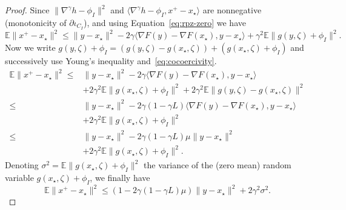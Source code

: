 \documentclass{article}
\newcommand{\1}{\mathbbm 1}
\newcommand{\bE}{{{\mathbb E}}}
\newcommand{\ps}[1]{\langle #1 \rangle}
\theoremstyle{definition}
\begin{document}
\begin{proof}
Since $\|\nabla ^\gamma h - \phi_I\|^2$ and $\ps{\nabla ^\gamma h - \phi_I,x^+-x_\star}$ are nonnegative (monotonicity of $\partial \iota_{C_I}$), and using Equation~\eqref{eq:rpz-zero} we have
\begin{equation*}
    \bE \|x^+ - x_\star\|^2 \leq \|y - x_\star\|^2 -2\gamma \ps{\nabla F(y) - \nabla F(x_\star),y-x_\star} + \gamma^2 \bE \|g(y,\zeta) + \phi_I\|^2.
\end{equation*}
Now we write $g(y,\zeta) + \phi_I = (g(y,\zeta) - g(x_\star,\zeta)) + (g(x_\star,\zeta) + \phi_I)$ and successively use Young's inequality and~\eqref{eq:cocoercivity}.
\begin{align*}
    \bE \|x^+ - x_\star\|^2 \leq& \|y - x_\star\|^2 -2\gamma \ps{\nabla F(y) - \nabla F(x_\star),y-x_\star}\\
    &+ 2\gamma^2 \bE \|g(x_\star,\zeta) + \phi_I\|^2 + 2\gamma^2 \bE\|g(y,\zeta) - g(x_\star,\zeta)\|^2\\
    \leq& \|y - x_\star\|^2 -2\gamma(1-\gamma L) \ps{\nabla F(y) - \nabla F(x_\star),y-x_\star}\\
    &+ 2\gamma^2 \bE \|g(x_\star,\zeta) + \phi_I\|^2\\
    \leq& \|y - x_\star\|^2 -2\gamma(1-\gamma L)\mu \|y-x_\star\|^2\\
    &+ 2\gamma^2 \bE \|g(x_\star,\zeta) + \phi_I\|^2.
\end{align*}
Denoting $\sigma^2 = \bE \|g(x_\star,\zeta) + \phi_I\|^2$ the variance of the (zero mean) random variable $g(x_\star,\zeta) + \phi_I$, we finally have
\begin{equation}
\label{eq:linear-neighborhood-rpsg}
    \bE \|x^+ - x_\star\|^2 \leq (1-2\gamma(1-\gamma L)\mu)\|y - x_\star\|^2 + 2\gamma^2 \sigma^2. 
\end{equation}
\end{proof}




\end{document}
